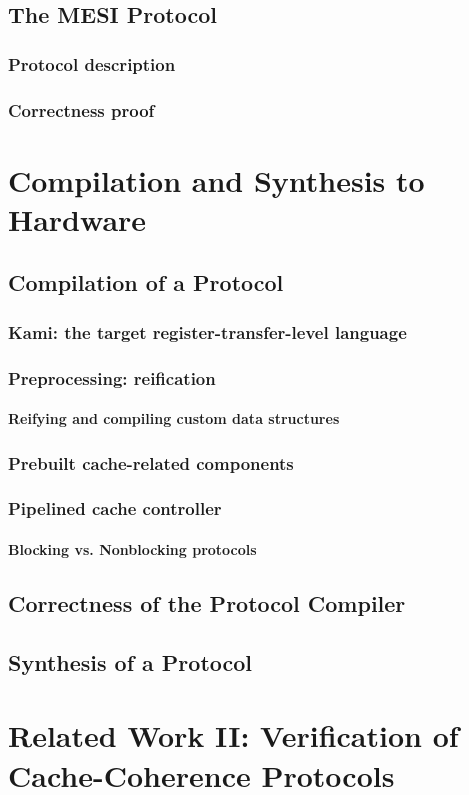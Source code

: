 \section{The MESI Protocol}
\label{sec-mesi-protocol}

\subsection{Protocol description}

\subsection{Correctness proof}
\label{sec-mesi-proof}

\chapter{Compilation and Synthesis to Hardware}
\label{sec-comp-syn}

\section{Compilation of a \hemiola{} Protocol}
\label{sec-compiler}

\subsection{Kami: the target register-transfer-level language}

\subsection{Preprocessing: reification}

\subsubsection{Reifying and compiling custom data structures}

\subsection{Prebuilt cache-related components}

\subsection{Pipelined cache controller}

\subsubsection{Blocking vs. Nonblocking protocols}

\section{Correctness of the Protocol Compiler}

\section{Synthesis of a \hemiola{} Protocol}
\label{sec-synthesis}

\chapter{Related Work II: Verification of Cache-Coherence Protocols}
